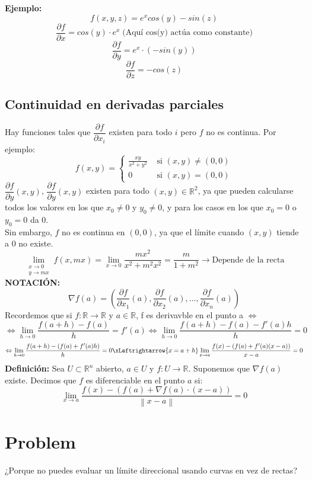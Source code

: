 \documentclass[11pt]{article}
\providecommand{\norm}[1]{\left\lVert #1 \right \rVert}
\providecommand{\norm}[1]{\left\lVert #1 \right \rVert}
\newcommand{\R}{\mathbb{R}}
\theoremstyle{plain}
\begin{document}
        \textbf{Ejemplo:}
        \[f(x,y,z) = e^ x cos(y) -sin(z)\]
        \[\frac{\partial f}{\partial x} = cos(y) \cdot e^x \; \text{(Aquí cos(y) actúa como constante)}\]
        \[\frac{\partial f}{\partial y} = e^x \cdot (-sin(y))\]
        \[\frac{\partial f}{\partial z} = - cos(z)\]

        \subsection{Continuidad en derivadas parciales} %
        \label{sub:continuidad_en_derivadas_parciales}
            Hay funciones tales que $\dfrac{\partial f}{\partial x_i}$ existen para todo $i$ pero $f$ no es continua. Por ejemplo: \\
                \begin{equation}
                    f(x,y) =
                    \begin{cases}
                        \frac{xy}{x^2 + y^2} &\text{ si } (x,y)\ne(0,0)\\
                        0 &\text{ si } (x,y) = (0,0)
                    \end{cases}
                \end{equation}
            $\dfrac{\partial f}{\partial y} (x,y)$, $\dfrac{\partial f}{\partial y} (x,y)$ existen para todo $(x,y) \in \R^2$, ya que pueden calcularse todos los valores en los que $x_0 \ne 0$ y $y_0 \ne 0$, y para los casos en los que $x_0 = 0$ o $y_0 = 0$ da 0. \\

            Sin embargo, $f$ no es continua en $(0,0)$, ya que el límite cuando $(x,y)$ tiende a 0 no existe.
            \[\lim_{\substack{x \to 0 \\ y \to mx}} f(x,mx) = \lim_{x \to 0} \frac{mx^2}{x^2 + m^2x^2} = \frac{m}{1 + m^2} \rightarrow \text{Depende de la recta}\]
        \textbf{NOTACIÓN:}
        \begin{equation}
            \nabla f(a) = \left( \frac{\partial f}{\partial x_1}(a), \frac{\partial f}{\partial x_2}(a), ... , \frac{\partial f}{\partial x_n}(a)\right) 
        \end{equation}
        Recordemos que si $f:\R \rightarrow \R$ y $a\in \R$, f es derivavble en el punto a $\Leftrightarrow$
        \[\Leftrightarrow \lim_{h \to 0} \frac{f(a+h) - f(a)}{h} = f'(a) \Leftrightarrow \lim_{h \to 0} \frac{f(a+h) - f(a) - f'(a)h}{h} = 0\]
        \[\Leftrightarrow \lim_{h\to 0} \frac{f(a+h) - (f(a)+f'(a)h)}{h} = 0 \xLeftrightarrow{x=a+h} \lim_{x\to a} \frac{f(x) - (f(a)+ f'(a)(x-a))}{x-a} = 0\]
        \textbf{Definición:} Sea $U \subset \R^n$ abierto, $a \in U$ y $f:U\rightarrow \R$. Suponemos que $\nabla f(a)$ existe. Decimos que $f$ es diferenciable en el punto $a$ si:
        \begin{equation}
            \lim_{x \to a} \frac{f(x) - (f(a) + \nabla f(a)\cdot (x-a))}{\norm{x-a}} = 0
        \end{equation}
    \section{Problem} %
    \label{sec:problem}
        ¿Porque no puedes evaluar un límite direccional usando curvas en vez de rectas?
\end{document}
